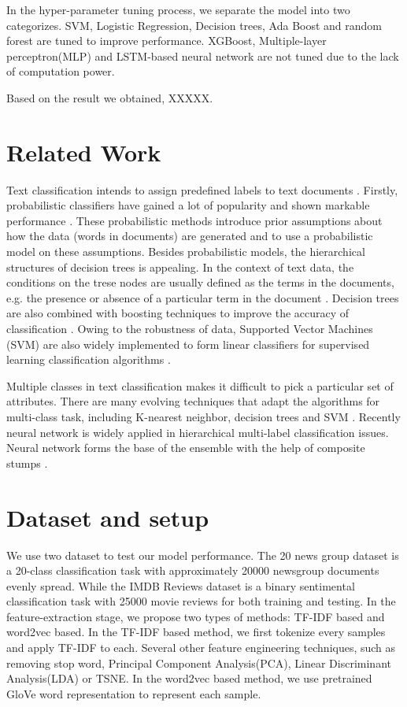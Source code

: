 \documentclass[11pt]{scrartcl}
\begin{document}
In the hyper-parameter tuning process, we separate the model into two categorizes. SVM, Logistic Regression, Decision trees, Ada Boost and random forest are tuned to improve performance. XGBoost, Multiple-layer perceptron(MLP) and LSTM-based neural network are not tuned due to the lack of computation power.

Based on the result we obtained, XXXXX.


\section{Related Work}
Text classification intends to assign predefined labels to text documents \cite{allahyari2017brief,thangaraj2018text}. Firstly, probabilistic classifiers have gained a lot of popularity and shown markable performance \cite{chakrabarti1997using,joachims1996probabilistic,koller1997hierarchically,larkey1996combining}. These probabilistic methods introduce prior assumptions about how the data (words in documents) are generated and to use a probabilistic model on these assumptions. Besides probabilistic models, the hierarchical structures of decision trees is appealing. In the context of text data, the conditions on the trese nodes are usually defined as the terms in the documents, e.g. the presence or absence of a particular term in the document \cite{breiman1984classification,duda2012pattern}. Decision trees are also combined with boosting techniques to improve the accuracy of classification \cite{freund1995desicion,schapire2000boostexter}. Owing to the robustness of data, Supported Vector Machines (SVM) are also widely implemented to form linear classifiers for supervised learning classification algorithms \cite{joachims1998text,joachims2001statistical}.

Multiple classes in text classification makes it difficult to pick a particular set of attributes. There are many evolving techniques that adapt the algorithms for multi-class task, including K-nearest neighbor, decision trees and SVM \cite{tang2016multi,yi2011multi}. Recently neural network is widely applied in hierarchical multi-label classification issues. Neural network forms the base of the ensemble with the help of composite stumps \cite{nie2015neural,cerri2014hierarchical}.


\section{Dataset and setup}
We use two dataset to test our model performance. The 20 news group dataset is a 20-class classification task with approximately 20000 newsgroup documents evenly spread\cite{Lang95}. While the IMDB Reviews dataset is a binary sentimental classification task with 25000 movie reviews for both training and testing\cite{maas-EtAl:2011:ACL-HLT2011}. In the feature-extraction stage, we propose two types of methods: TF-IDF based and word2vec based. In the TF-IDF based method, we first tokenize every samples and apply TF-IDF to each. Several other feature engineering techniques, such as removing stop word, Principal Component Analysis(PCA), Linear Discriminant Analysis(LDA) or TSNE. In the word2vec based method, we use pretrained GloVe\cite{pennington2014glove} word representation to represent each sample.
\end{document}
